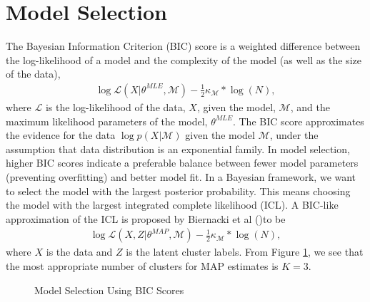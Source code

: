 \documentclass{article}
\theoremstyle{theorem}
\theoremstyle{theorem}
\theoremstyle{theorem}
\theoremstyle{lemma}
\theoremstyle{definition}
\theoremstyle{example}
\begin{document}
\section{Model Selection}
The Bayesian Information Criterion (BIC) score is a weighted difference between the log-likelihood of a model and the complexity of the model (as well as the size of the data), 
\begin{align}
\log\mathcal{L}(X | \theta^{MLE}, \mathcal{M}) - \frac{1}{2} \kappa_\mathcal{M} * \log(N),
\end{align}
where $\mathcal{L}$ is the log-likelihood of the data, $X$, given the model, $\mathcal{M}$, and the maximum likelihood parameters of the model, $\theta^{MLE}$. The BIC score approximates the evidence for the data $\log p(X | \mathcal{M})$ given the model $\mathcal{M}$, under the assumption that data distribution is an exponential family. In model selection, higher BIC scores indicate a preferable balance between fewer model parameters (preventing overfitting) and better model fit. In a Bayesian framework, we want to select the model with the largest posterior probability. This means choosing the model with the largest integrated complete likelihood (ICL). A BIC-like approximation of the ICL is proposed by Biernacki et al (\cite{Biernacki})to be 
\begin{align}
\log \mathcal{L}(X, Z | \theta^{MAP},  \mathcal{M}) -  \frac{1}{2} \kappa_\mathcal{M} * \log(N),
\end{align}
where $X$ is the data and $Z$ is the latent cluster labels.
From Figure \ref{fig:bic}, we see that the most appropriate number of clusters for MAP estimates is $K=3$.
\begin{figure}[h!]
\begin{center}
\caption{Model Selection Using BIC Scores}
\hskip1cm
\end{center}\label{fig:bic}
\vskip -0.2in
\end{figure} 
\end{document}
